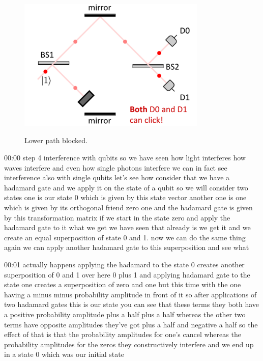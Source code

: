 \begin{figure}[H]
   \centering
    \includegraphics[width=0.8\textwidth]{lesson6/bottom_blocked.pdf}
    \label{fig: 1}
    \begin{center}
        \caption{Lower path blocked.}
    \end{center}
\end{figure}


00:00
step 4 interference with qubits so we have seen how light interferes how
waves interfere and even how single photons interfere we can in fact see
interference also with single qubits let's see how
consider that we have a hadamard gate and we apply it on the state of a qubit
so we will consider two states one is our state 0 which is given by this state
vector another one is one which is given by its orthogonal
friend zero one and the hadamard gate is given by this transformation matrix
if we start in the state zero and apply the hadamard gate to it
what we get we have seen that already is we get it and we create an equal
superposition of state 0 and 1. now we can do the same thing again we
can apply another hadamard gate to this superposition and see what

00:01
actually happens applying the hadamard to the state 0
creates another superposition of 0 and 1
over here 0 plus 1 and applying hadamard gate to the state one
creates a superposition of zero and one but this time
with the one having a minus minus probability amplitude in front of it so after
applications of two hadamard gates this is our state you can see
that these terms they both have a positive probability amplitude
plus a half plus a half whereas the other two terms have opposite
amplitudes they've got plus a half and negative a half so the effect of that
is that the probability amplitudes for one's cancel
whereas the probability amplitudes for the zeros they
constructively interfere and we end up in a state 0 which was our initial state


